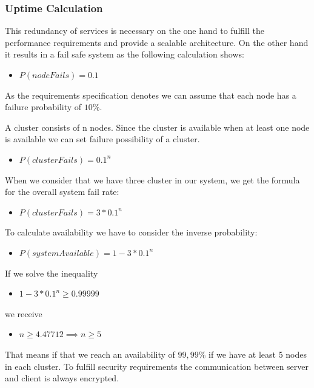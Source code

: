 \documentclass[11pt]{article}
\begin{document}
\subsubsection{Uptime Calculation}

This redundancy of services is necessary on the one hand to fulfill the performance requirements and provide a scalable architecture. On the other hand it results in a fail safe system as the following calculation shows:

\begin{itemize}
\item $P(nodeFails) = 0.1$
\end{itemize}

As the requirements specification denotes we can assume that each node has a failure probability of $10\%$.

A cluster consists of n nodes. Since the cluster is available when at least one node is available we can set failure possibility of a cluster.

\begin{itemize}
\item $P(clusterFails) = 0.1^n$
\end{itemize}

When we consider that we have three cluster in our system, we get the formula for the overall system fail rate:

\begin{itemize}
\item $P(clusterFails) = 3 *0.1^n$
\end{itemize}

To calculate availability we have to consider the inverse probability:

\begin{itemize}
\item $P(systemAvailable) = 1 - 3 *0.1^n$
\end{itemize}

If we solve the inequality

\begin{itemize}
\item $1 - 3 *0.1^n \ge 0.99999$
\end{itemize}

we receive

\begin{itemize}
\item $n \ge 4.47712 \implies n \ge 5$
\end{itemize}

That means if that we reach an availability of $99,99\%$ if we have at least 5 nodes in each cluster. To fulfill security requirements the communication between server and client is always encrypted.
\end{document}
